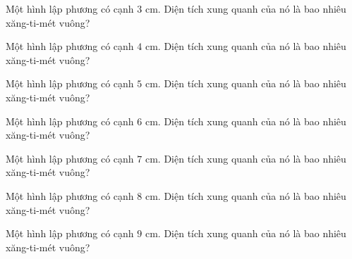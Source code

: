 
\begin{ex}
  Một hình lập phương có cạnh $3\text{ cm}$. Diện tích xung quanh của nó là bao nhiêu xăng-ti-mét vuông?
\end{ex}

\begin{ex}
  Một hình lập phương có cạnh $4\text{ cm}$. Diện tích xung quanh của nó là bao nhiêu xăng-ti-mét vuông?
\end{ex}

\begin{ex}
  Một hình lập phương có cạnh $5\text{ cm}$. Diện tích xung quanh của nó là bao nhiêu xăng-ti-mét vuông?
\end{ex}

\begin{ex}
  Một hình lập phương có cạnh $6\text{ cm}$. Diện tích xung quanh của nó là bao nhiêu xăng-ti-mét vuông?
\end{ex}

\begin{ex}
  Một hình lập phương có cạnh $7\text{ cm}$. Diện tích xung quanh của nó là bao nhiêu xăng-ti-mét vuông?
\end{ex}

\begin{ex}
  Một hình lập phương có cạnh $8\text{ cm}$. Diện tích xung quanh của nó là bao nhiêu xăng-ti-mét vuông?
\end{ex}

\begin{ex}
  Một hình lập phương có cạnh $9\text{ cm}$. Diện tích xung quanh của nó là bao nhiêu xăng-ti-mét vuông?
\end{ex}

